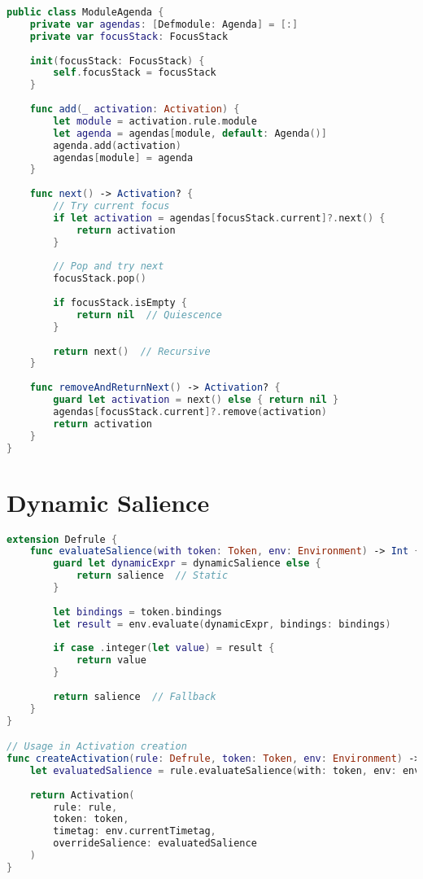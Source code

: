 \begin{lstlisting}[language=Swift]
public class ModuleAgenda {
    private var agendas: [Defmodule: Agenda] = [:]
    private var focusStack: FocusStack
    
    init(focusStack: FocusStack) {
        self.focusStack = focusStack
    }
    
    func add(_ activation: Activation) {
        let module = activation.rule.module
        let agenda = agendas[module, default: Agenda()]
        agenda.add(activation)
        agendas[module] = agenda
    }
    
    func next() -> Activation? {
        // Try current focus
        if let activation = agendas[focusStack.current]?.next() {
            return activation
        }
        
        // Pop and try next
        focusStack.pop()
        
        if focusStack.isEmpty {
            return nil  // Quiescence
        }
        
        return next()  // Recursive
    }
    
    func removeAndReturnNext() -> Activation? {
        guard let activation = next() else { return nil }
        agendas[focusStack.current]?.remove(activation)
        return activation
    }
}
\end{lstlisting}

\section{Dynamic Salience}

\begin{lstlisting}[language=Swift]
extension Defrule {
    func evaluateSalience(with token: Token, env: Environment) -> Int {
        guard let dynamicExpr = dynamicSalience else {
            return salience  // Static
        }
        
        let bindings = token.bindings
        let result = env.evaluate(dynamicExpr, bindings: bindings)
        
        if case .integer(let value) = result {
            return value
        }
        
        return salience  // Fallback
    }
}

// Usage in Activation creation
func createActivation(rule: Defrule, token: Token, env: Environment) -> Activation {
    let evaluatedSalience = rule.evaluateSalience(with: token, env: env)
    
    return Activation(
        rule: rule,
        token: token,
        timetag: env.currentTimetag,
        overrideSalience: evaluatedSalience
    )
}
\end{lstlisting}

